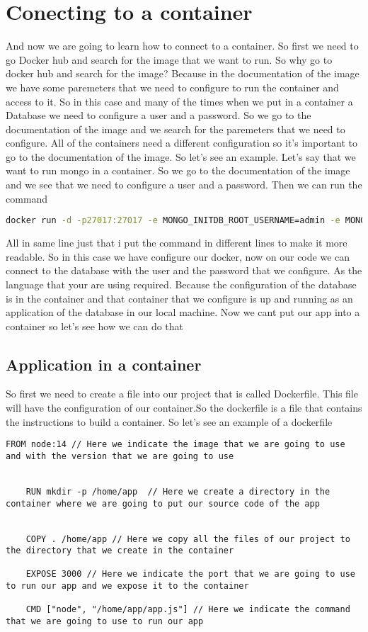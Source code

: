 \documentclass{article}
\begin{document}
\section*{Conecting to a container}
And now we are going to learn how to connect to a container. So first we need to go Docker hub and search for the 
image that we want to run. So why go to docker hub and search for the image? Because in the documentation of the image
we have some paremeters that we need to configure to run the container and access to it. So in this case and many of the 
times when we put in a container a Database we need to configure a user and a password. So we go to the documentation of
the image and we search for the paremeters that we need to configure. All of the containers need a different configuration
so it's important to go to the documentation of the image. So let's see an example. Let's say that we want to run  mongo 
in a container. So we go to the documentation of the image and we see that we need to configure a user and a password. Then
we can run the command
\begin{lstlisting}[language=bash, breaklines=true, breakatwhitespace=true]
    docker run -d -p27017:27017 -e MONGO_INITDB_ROOT_USERNAME=admin -e MONGO_INITDB_ROOT_PASSWORD=admin --name mongo 
\end{lstlisting}
All in same line just that i put the command in different lines to make it more readable. So in this case we have configure our 
docker, now on our code we can connect to the database with the user and the password that we configure. As the language that your are 
using required. Because the configuration of the database is in the container and that container that we configure is up and running 
as an application of the database in our local machine. Now we cant put our app into a container so let's see how we can do that 
\subsection*{Application in a container}
So first we need to create a file into our project that is called Dockerfile. This file will have the configuration of our 
container.So the dockerfile is a file that contains the instructions to build a container. So let's see an example of a dockerfile
\begin{lstlisting}[breaklines=true, breakatwhitespace=true]
    FROM node:14 // Here we indicate the image that we are going to use and with the version that we are going to use


    RUN mkdir -p /home/app  // Here we create a directory in the container where we are going to put our source code of the app
    

    COPY . /home/app // Here we copy all the files of our project to the directory that we create in the container
    
    EXPOSE 3000 // Here we indicate the port that we are going to use to run our app and we expose it to the container

    CMD ["node", "/home/app/app.js"] // Here we indicate the command that we are going to use to run our app

\end{lstlisting}
\end{document}
